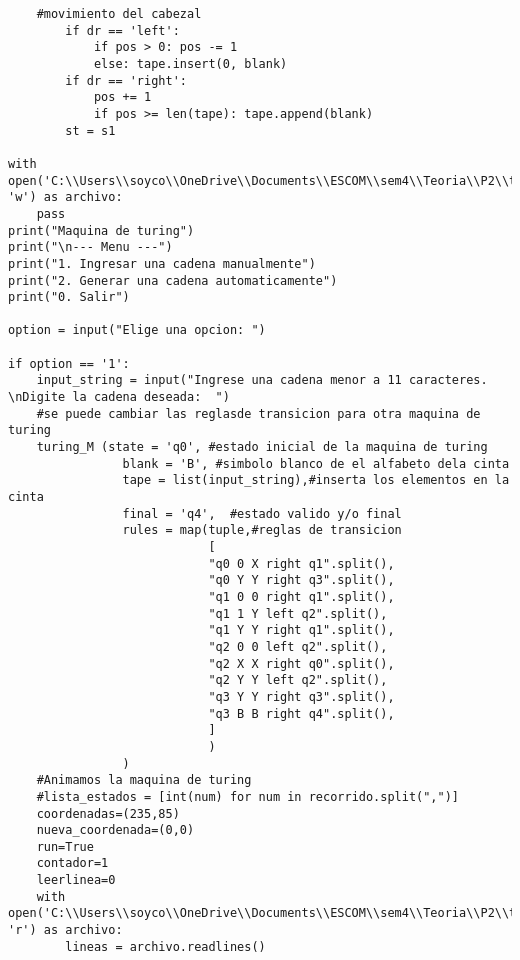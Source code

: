 \begin{lstlisting}
    #movimiento del cabezal
        if dr == 'left':
            if pos > 0: pos -= 1
            else: tape.insert(0, blank)
        if dr == 'right':
            pos += 1
            if pos >= len(tape): tape.append(blank)
        st = s1
        
with open('C:\\Users\\soyco\\OneDrive\\Documents\\ESCOM\\sem4\\Teoria\\P2\\turing\\output\\turing.txt', 'w') as archivo:
    pass
print("Maquina de turing")
print("\n--- Menu ---")
print("1. Ingresar una cadena manualmente")
print("2. Generar una cadena automaticamente")
print("0. Salir")

option = input("Elige una opcion: ")

if option == '1':
    input_string = input("Ingrese una cadena menor a 11 caracteres. \nDigite la cadena deseada:  ")
    #se puede cambiar las reglasde transicion para otra maquina de turing
    turing_M (state = 'q0', #estado inicial de la maquina de turing
                blank = 'B', #simbolo blanco de el alfabeto dela cinta
                tape = list(input_string),#inserta los elementos en la cinta
                final = 'q4',  #estado valido y/o final
                rules = map(tuple,#reglas de transicion
                            [
                            "q0 0 X right q1".split(),
                            "q0 Y Y right q3".split(),
                            "q1 0 0 right q1".split(),
                            "q1 1 Y left q2".split(),
                            "q1 Y Y right q1".split(),
                            "q2 0 0 left q2".split(),
                            "q2 X X right q0".split(),
                            "q2 Y Y left q2".split(),
                            "q3 Y Y right q3".split(),
                            "q3 B B right q4".split(),
                            ]   
                            )
                )  
    #Animamos la maquina de turing
    #lista_estados = [int(num) for num in recorrido.split(",")]
    coordenadas=(235,85)
    nueva_coordenada=(0,0)
    run=True
    contador=1
    leerlinea=0
    with open('C:\\Users\\soyco\\OneDrive\\Documents\\ESCOM\\sem4\\Teoria\\P2\\turing\\output\\turing.txt', 'r') as archivo:
        lineas = archivo.readlines()
    

\end{lstlisting}
